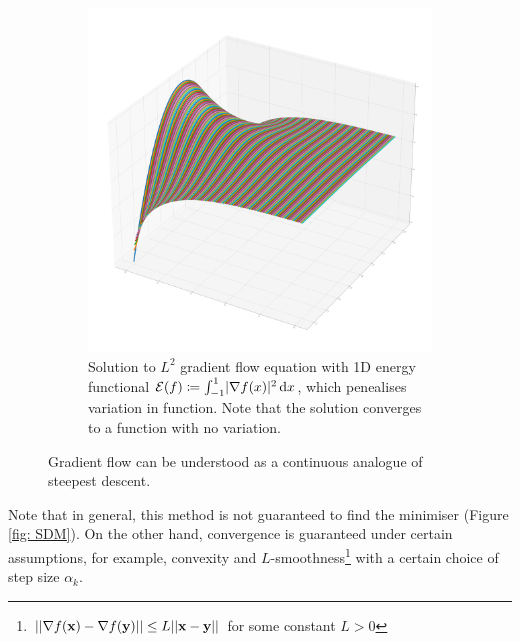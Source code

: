 \documentclass[../dissertation.tex]{subfiles}
\begin{document}
\begin{figure}[tbp]
\begin{subfigure}[b]{0.4\textwidth}
        \includegraphics[width=\textwidth]{sections/gradientFlowImgs/gf}
        \caption{Solution to $L^2$ gradient flow equation with 1D energy functional $\mathcal{E} (f) \coloneqq \int_{-1}^1 \lvert\nabla f(x)\lvert^2 \, \text{d} x$, which penealises variation in function. Note that the solution converges to a function with no variation.}
        \label{fig: GF}
    \end{subfigure}
    \caption{Gradient flow can be understood as a continuous analogue of steepest descent.}
\end{figure}
Note that in general, this method is not guaranteed to find the minimiser (Figure \ref{fig: SDM}).
On the other hand, convergence is guaranteed under certain assumptions, for example, convexity and $L$-smoothness\footnote{$\lvert \lvert \nabla f(\mathbf{x}) - \nabla f(\mathbf{y}) \rvert \rvert \leq L \lvert \lvert \mathbf{x}-\mathbf{y} \rvert \rvert$ for some constant $L > 0$}
with a certain choice of step size $\alpha_k$.
\end{document}
